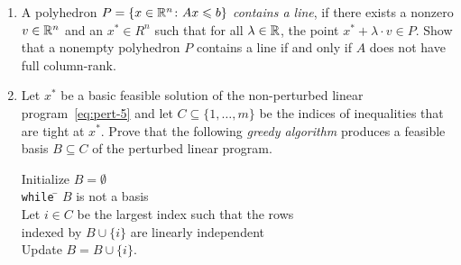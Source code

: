 \begin{enumerate}
\item A polyhedron $P = \{x \in \mathbb{R}^n \colon Ax\leqslant b\}$ \emph{contains a
    line}, if there exists a nonzero $v \in \mathbb{R}^n$ and an $x^* \in R
^n$ such that for all $\lambda \in \mathbb{R}$, the point $x^* + \lambda\cdot v \in P$. Show
that a nonempty polyhedron $P$ contains a line if and only if $A$ does not have full
column-rank. \label{xitem:10}
\item \label{item:pert-3} Let $x^*$ be a basic feasible solution of the non-perturbed linear program~\eqref{eq:pert-5} and let $C\subseteq \{1,\dots,m\}$ be the indices of inequalities that are tight at $x^*$. Prove that the following \emph{greedy algorithm} produces a feasible basis $B\subseteq C$ of the perturbed linear program.
 \begin{tabbing}
    Initialize $B = \emptyset$ \\
    {\tt while} \= $B$ is not a basis \\ 
      \> Let $i\in C$ be the largest index such that the rows \\
      \>  indexed by  $B \cup\{i\}$ are linearly independent \\[.1ex]
      \> Update $B = B \cup\{i\}$. 
    \end{tabbing}
\end{enumerate}




